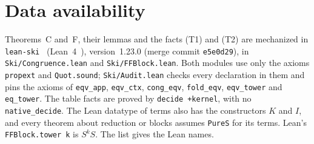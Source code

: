 \documentclass[11pt]{amsart}
\theoremstyle{definition}
\begin{document}
\section*{Data availability}
\sloppy
Theorems~C and~F, their lemmas and the facts (T1) and (T2) are mechanized in
\texttt{lean-ski}~\citep{leanski} (Lean~4~\citep{lean4}), version~1.23.0 (merge commit
\texttt{e5e0d29}), in \texttt{Ski/Congruence.lean} and \texttt{Ski/FFBlock.lean}. Both modules use only
the axioms \texttt{propext} and \texttt{Quot.sound}; \texttt{Ski/Audit.lean} checks every declaration in
them and pins the axioms of \texttt{eqv\_app}, \texttt{eqv\_ctx}, \texttt{cong\_eqv},
\texttt{fold\_eqv}, \texttt{eqv\_tower} and \texttt{eq\_tower}. The table facts are proved by
\texttt{decide +kernel}, with no \texttt{native\_decide}. The Lean datatype of terms also has the
constructors $K$ and $I$, and every theorem about reduction or blocks assumes \texttt{PureS} for its terms. Lean's
\texttt{FFBlock.tower k} is $S^kS$. The list gives the Lean names.
\end{document}
